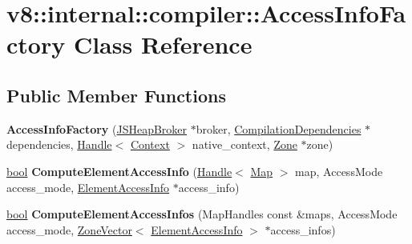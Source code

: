 \hypertarget{classv8_1_1internal_1_1compiler_1_1AccessInfoFactory}{}\section{v8\+:\+:internal\+:\+:compiler\+:\+:Access\+Info\+Factory Class Reference}
\label{classv8_1_1internal_1_1compiler_1_1AccessInfoFactory}
\subsection*{Public Member Functions}
\begin{DoxyCompactItemize}
\item 
\mbox{\label{classv8_1_1internal_1_1compiler_1_1AccessInfoFactory_a17028a5c2dfab42c5ef1d815a65376fd}} 
{\bfseries Access\+Info\+Factory} (\mbox{\hyperlink{classv8_1_1internal_1_1compiler_1_1JSHeapBroker}{J\+S\+Heap\+Broker}} $\ast$broker, \mbox{\hyperlink{classv8_1_1internal_1_1compiler_1_1CompilationDependencies}{Compilation\+Dependencies}} $\ast$dependencies, \mbox{\hyperlink{classv8_1_1internal_1_1Handle}{Handle}}$<$ \mbox{\hyperlink{classv8_1_1internal_1_1Context}{Context}} $>$ native\+\_\+context, \mbox{\hyperlink{classv8_1_1internal_1_1Zone}{Zone}} $\ast$zone)
\item 
\mbox{\label{classv8_1_1internal_1_1compiler_1_1AccessInfoFactory_aa7540604d39b50722ee923b8ffaf2145}} 
\mbox{\hyperlink{classbool}{bool}} {\bfseries Compute\+Element\+Access\+Info} (\mbox{\hyperlink{classv8_1_1internal_1_1Handle}{Handle}}$<$ \mbox{\hyperlink{classv8_1_1internal_1_1Map}{Map}} $>$ map, Access\+Mode access\+\_\+mode, \mbox{\hyperlink{classv8_1_1internal_1_1compiler_1_1ElementAccessInfo}{Element\+Access\+Info}} $\ast$access\+\_\+info)
\item 
\mbox{\label{classv8_1_1internal_1_1compiler_1_1AccessInfoFactory_a7345a8226a62eb0200a7a07d1a834dae}} 
\mbox{\hyperlink{classbool}{bool}} {\bfseries Compute\+Element\+Access\+Infos} (Map\+Handles const \&maps, Access\+Mode access\+\_\+mode, \mbox{\hyperlink{classv8_1_1internal_1_1ZoneVector}{Zone\+Vector}}$<$ \mbox{\hyperlink{classv8_1_1internal_1_1compiler_1_1ElementAccessInfo}{Element\+Access\+Info}} $>$ $\ast$access\+\_\+infos)

\end{DoxyCompactItemize}
